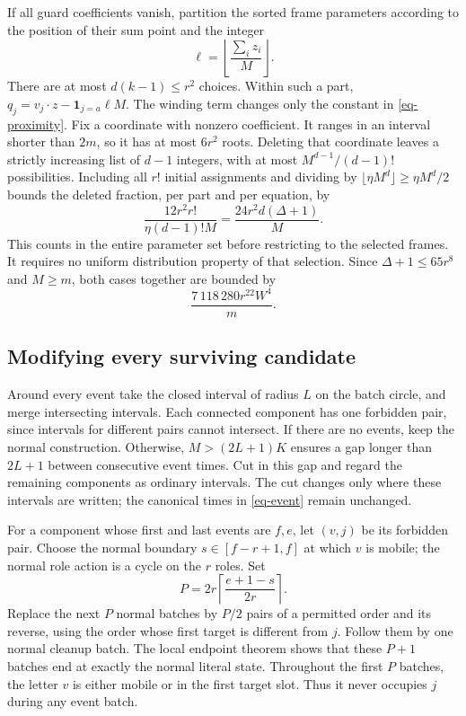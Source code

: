 If all guard coefficients vanish, partition the sorted frame parameters
according to the position of their sum point and the integer
\[
 \ell=\left\lfloor\frac{\sum_i z_i}{M}\right\rfloor.
\]
There are at most $d(k-1)\le r^2$ choices. Within such a part,
$q_j=v_j\cdot z-\mathbf{1}_{j=a}\ell M$. The winding term changes only
the constant in \eqref{eq-proximity}. Fix a coordinate with nonzero
coefficient. It ranges in an interval shorter than $2m$, so it has at
most $6r^2$ roots. Deleting that coordinate leaves a strictly increasing
list of $d-1$ integers, with at most $M^{d-1}/(d-1)!$ possibilities.
Including all $r!$ initial assignments and dividing by
$\lfloor\eta M^d\rfloor\ge\eta M^d/2$ bounds the deleted fraction,
per part and per equation, by
\[
 \frac{12r^2r!}{\eta(d-1)!M}
 =\frac{24r^2d(\Delta+1)}{M}.
\]
This counts in the entire parameter set before restricting to the selected
frames. It requires no uniform distribution property of that selection.
Since $\Delta+1\le65r^8$ and $M\ge m$, both cases together are bounded by
\begin{equation}\label{eq-proximity-loss}
 \frac{7\,118\,280r^{22}W^4}{m}.
\end{equation}

\subsection{Modifying every surviving candidate}

Around every event take the closed interval of radius $L$ on the batch
circle, and merge intersecting intervals. Each connected component has
one forbidden pair, since intervals for different pairs cannot intersect.
If there are no events, keep the normal construction. Otherwise,
$M>(2L+1)K$ ensures a gap longer than $2L+1$ between consecutive event
times. Cut in this gap and regard the remaining components as ordinary
intervals. The cut changes only where these intervals are written; the
canonical times in \eqref{eq-event} remain unchanged.

For a component whose first and last events are $f,e$, let $(v,j)$ be
its forbidden pair. Choose the normal boundary $s\in[f-r+1,f]$ at
which $v$ is mobile; the normal role action is a cycle on the $r$ roles.
Set
\[
 P=2r\left\lceil\frac{e+1-s}{2r}\right\rceil.
\]
Replace the next $P$ normal batches by $P/2$ pairs of a permitted order
and its reverse, using the order whose first target is different from
$j$. Follow them by one normal cleanup batch. The local endpoint theorem
shows that these $P+1$ batches end at exactly the normal literal state.
Throughout the first $P$ batches, the letter $v$ is either mobile or in
the first target slot. Thus it never occupies $j$ during any event batch.

